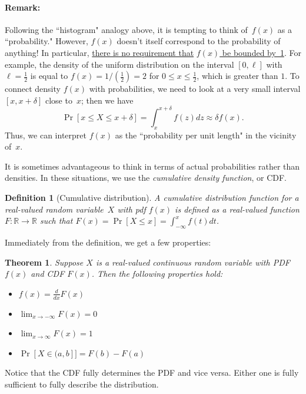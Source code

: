 \documentclass[11pt]{article}
\def\ul#1{\underline{#1}}
\newcounter{thm}
\newtheorem{theorem}{Theorem}[thm]
\newtheorem{definition}{Definition}[thm]
\begin{document}
\paragraph{Remark:} Following the ``histogram" analogy above,
it is tempting to think of~$f(x)$ as a ``probability."  However,
$f(x)$ doesn't itself correspond to the probability of anything! In particular,
\ul{there is no requirement that} \ul{$f(x)$ be bounded by~1}. For example,
the density of the uniform distribution on the interval $[0,\ell]$ with $\ell = \frac{1}{2}$ is equal to
$f(x) = 1/(\frac{1}{2}) = 2$ for $0 \le x \le \frac{1}{2}$, which is greater than $1$.
To connect density $f(x)$ with probabilities,
we need to look at a very small interval $[x,x+\delta]$ close
to~$x$; then we have
\begin{equation}
\label{eq:small}
   \Pr[x\le X\le x+\delta] = \int_{x}^{x+\delta} f(z) dz \approx \delta f(x).
\end{equation}
Thus, we can interpret $f(x)$ as the ``probability per unit length" in the vicinity
of~$x$.

It is sometimes advantageous to think in terms of actual probabilities rather than densities.
In these situations, we use the \emph{cumulative density function}, or CDF.

\begin{definition}[Cumulative distribution]
A {\em cumulative distribution function} for a real-valued random variable~$X$ with pdf $f(x)$ is defined as a real-valued function $F:\mathbb{R} \rightarrow \mathbb{R}$ such that $F(x) = \Pr[X \le x] = \int_{-\infty}^x f(t) dt$.
\end{definition}

Immediately from the definition, we get a few properties:

\begin{theorem}
Suppose $X$ is a real-valued continuous random variable with PDF $f(x)$ and CDF $F(x)$. Then the following properties hold:
\begin{itemize}
  \item $f(x) = \frac{d}{dx}F(x)$
  \item $\lim_{x\rightarrow -\infty} F(x) = 0$
  \item $\lim_{x\rightarrow \infty} F(x) = 1$
  \item $\Pr[X \in (a,b]] = F(b) - F(a)$
\end{itemize}
\end{theorem}

Notice that the CDF fully determines the PDF and vice versa. Either one is fully sufficient to fully describe the distribution.
\end{document}
